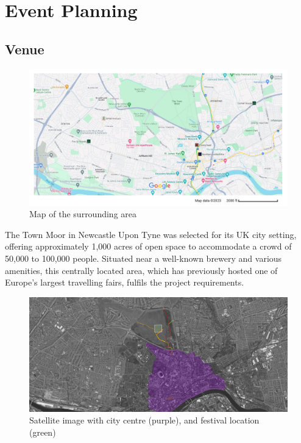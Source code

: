 \section{Event Planning}
    \subsection{Venue}

        \begin{figure}[H]
            \centering
            \includegraphics[width=\textwidth]{Images/festival_maps.jpg}
            \caption{Map of the surrounding area}
            \label{fig:festival_map}
        \end{figure}
        
        The Town Moor in Newcastle Upon Tyne was selected for its UK city setting, offering approximately 1,000 acres of open space to accommodate a crowd of 50,000 to 100,000 people. Situated near a well-known brewery and various amenities, this centrally located area, which has previously hosted one of Europe's largest travelling fairs, fulfils the project requirements.
        
        \begin{figure}[H]
            \centering
            \includegraphics[width=\textwidth]{Images/festival_expand.jpg}
            \caption{Satellite image with city centre (purple), and festival location (green)}
            \label{fig:festival_expand}
        \end{figure}

